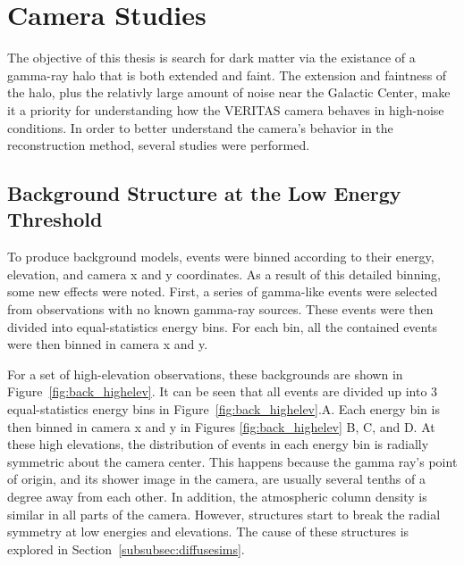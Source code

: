   \FloatBarrier

\section{Camera Studies}
  The objective of this thesis is search for dark matter via the existance of a gamma-ray halo that is both extended and faint.
  The extension and faintness of the halo, plus the relativly large amount of noise near the Galactic Center, make it a priority for understanding how the VERITAS camera behaves in high-noise conditions.
  In order to better understand the camera's behavior in the reconstruction method, several studies were performed.

  \subsection{Background Structure at the Low Energy Threshold}\label{subsec:bkgstructure}
    To produce background models, events were binned according to their energy, elevation, and camera x and y coordinates.
    As a result of this detailed binning, some new effects were noted.
    First, a series of gamma-like events were selected from observations with no known gamma-ray sources.
    These events were then divided into equal-statistics energy bins.
    For each bin, all the contained events were then binned in camera x and y.

    For a set of high-elevation observations, these backgrounds are shown in Figure~\ref{fig:back_highelev}.
    It can be seen that all events are divided up into 3 equal-statistics energy bins in Figure~\ref{fig:back_highelev}.A.
    Each energy bin is then binned in camera x and y in Figures \ref{fig:back_highelev} B, C, and D.
    At these high elevations, the distribution of events in each energy bin is radially symmetric about the camera center.
    This happens because the gamma ray's point of origin, and its shower image in the camera, are usually several tenths of a degree away from each other.
    In addition, the atmospheric column density is similar in all parts of the camera.
    However, structures start to break the radial symmetry at low energies and elevations.
    The cause of these structures is explored in Section~\ref{subsubsec:diffusesims}.

